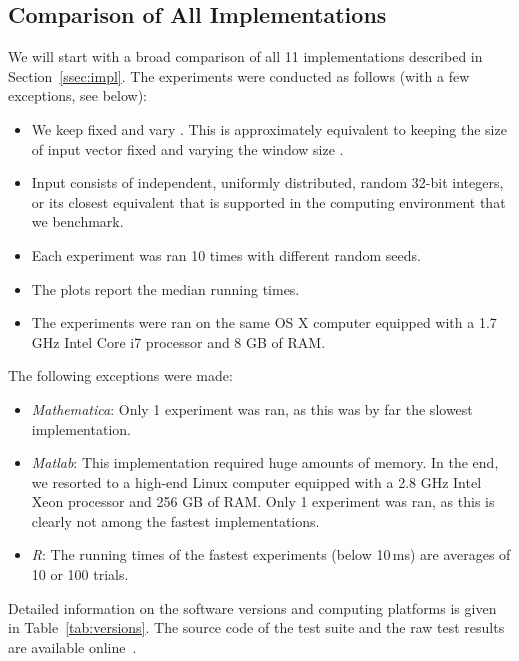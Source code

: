 \documentclass[a4paper,11pt]{article}
\begin{document}
\subsection{Comparison of All Implementations}\label{ssec:comp-other}

We will start with a broad comparison of all 11 implementations described in Section~\ref{ssec:impl}. The experiments were conducted as follows (with a few exceptions, see below):
\begin{itemize}
    \item We keep  fixed and vary . This is approximately equivalent to keeping the size of input vector  fixed and varying the window size .
    \item Input consists of independent, uniformly distributed, random 32-bit integers, or its closest equivalent that is supported in the computing environment that we benchmark.
    \item Each experiment was ran 10 times with different random seeds.
    \item The plots report the median running times.
    \item The experiments were ran on the same OS X computer equipped with a 1.7 GHz Intel Core i7 processor and 8 GB of RAM.
\end{itemize}
The following exceptions were made:
\begin{itemize}
    \item \emph{Mathematica}: Only 1 experiment was ran, as this was by far the slowest implementation.
    \item \emph{Matlab}: This implementation required huge amounts of memory. In the end, we resorted to a high-end Linux computer equipped with a 2.8 GHz Intel Xeon processor and 256 GB of RAM. Only 1 experiment was ran, as this is clearly not among the fastest implementations.
    \item \emph{R}: The running times of the fastest experiments (below 10\,ms) are averages of 10 or 100 trials.
\end{itemize}
Detailed information on the software versions and computing platforms is given in Table~\ref{tab:versions}. The source code of the test suite and the raw test results are available online~.
\end{document}
